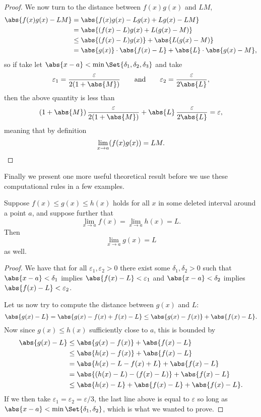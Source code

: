 \begin{proof}
	We now turn to the distance between $f(x)g(x)$ and $LM$,
	\begin{align*}
		\abs{f(x)g(x) - LM} & = \abs{f(x)g(x) - L g(x) + L g(x) - LM}                           \\
		                    & = \abs{(f(x) - L) g(x) + L(g(x) - M)}                             \\
		                    & \leq \abs{(f(x) - L) g(x)} + \abs{L (g(x) - M)}                   \\
		                    & = \abs{g(x)} \cdot \abs{f(x) - L} + \abs{L} \cdot \abs{g(x) - M},
	\end{align*}
	so if take let $\abs{x - a} < \min\Set{\delta_1, \delta_2, \delta_3}$ and take
	\[
		\varepsilon_1 = \frac{\varepsilon}{2 (1 + \abs{M})} \qquad \text{and} \qquad \varepsilon_2 = \frac{\varepsilon}{2 \abs{L}},
	\]
	then the above quantity is less than
	\[
		(1 + \abs{M}) \, \frac{\varepsilon}{2 (1 + \abs{M})} + \abs{L} \, \frac{\varepsilon}{2 \abs{L}} = \varepsilon,
	\]
	meaning that by definition
	\[
		\lim_{x \to a} (f(x)g(x)) = LM. \qedhere
	\]
\end{proof}

\noindent
Finally we present one more useful theoretical result before we use these computational rules in a few examples.

\begin{theorem}
	Suppose $f(x) \leq g(x) \leq h(x)$ holds for all $x$ in some deleted interval around a point $a$, and suppose further that
	\[
		\lim_{x \to a} f(x) = \lim_{x \to a} h(x) = L.
	\]
	Then
	\[
		\lim_{x \to a} g(x) = L
	\]
	as well.
\end{theorem}

\begin{proof}
	We have that for all $\varepsilon_1, \varepsilon_2 > 0$ there exist some $\delta_1, \delta_2 > 0$ such that $\abs{x - a} < \delta_1$ implies $\abs{f(x) - L} < \varepsilon_1$ and $\abs{x - a} < \delta_2$ implies $\abs{f(x) - L} < \varepsilon_2$.

	Let us now try to compute the distance between $g(x)$ and $L$:
	\[
		\abs{g(x) - L} = \abs{g(x) - f(x) + f(x) - L} \leq \abs{g(x) - f(x)} + \abs{f(x) - L}.
	\]
	Now since $g(x) \leq h(x)$ sufficiently close to $a$, this is bounded by
	\begin{align*}
		\abs{g(x) - L} & \leq \abs{g(x) - f(x)} + \abs{f(x) - L}                \\
		               & \leq \abs{h(x) - f(x)} + \abs{f(x) - L}                \\
		               & = \abs{h(x) - L - f(x) + L} + \abs{f(x) - L}           \\
		               & = \abs{(h(x) - L) - (f(x) - L)} + \abs{f(x) - L}       \\
		               & \leq \abs{h(x) - L} + \abs{f(x) - L} + \abs{f(x) - L}.
	\end{align*}
	If we then take $\varepsilon_1 = \varepsilon_2 = \varepsilon / 3$, the last line above is equal to $\varepsilon$ so long as $\abs{x - a} < \min\Set{\delta_1, \delta_2}$, which is what we wanted to prove.
\end{proof}

